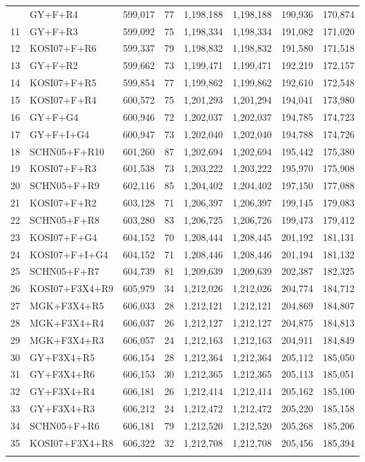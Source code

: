 \begin{longtable}{rlrrrrrr}
{10&GY+F+R4&599,017&77&1,198,188&1,198,188&190,936&170,874\\
11&GY+F+R3&599,092&75&1,198,334&1,198,334&191,082&171,020\\
12&KOSI07+F+R6&599,337&79&1,198,832&1,198,832&191,580&171,518\\
13&GY+F+R2&599,662&73&1,199,471&1,199,471&192,219&172,157\\
14&KOSI07+F+R5&599,854&77&1,199,862&1,199,862&192,610&172,548\\
15&KOSI07+F+R4&600,572&75&1,201,293&1,201,294&194,041&173,980\\
16&GY+F+G4&600,946&72&1,202,037&1,202,037&194,785&174,723\\
17&GY+F+I+G4&600,947&73&1,202,040&1,202,040&194,788&174,726\\
18&SCHN05+F+R10&601,260&87&1,202,694&1,202,694&195,442&175,380\\
19&KOSI07+F+R3&601,538&73&1,203,222&1,203,222&195,970&175,908\\
20&SCHN05+F+R9&602,116&85&1,204,402&1,204,402&197,150&177,088\\
21&KOSI07+F+R2&603,128&71&1,206,397&1,206,397&199,145&179,083\\
22&SCHN05+F+R8&603,280&83&1,206,725&1,206,726&199,473&179,412\\
23&KOSI07+F+G4&604,152&70&1,208,444&1,208,445&201,192&181,131\\
24&KOSI07+F+I+G4&604,152&71&1,208,446&1,208,446&201,194&181,132\\
25&SCHN05+F+R7&604,739&81&1,209,639&1,209,639&202,387&182,325\\
26&KOSI07+F3X4+R9&605,979&34&1,212,026&1,212,026&204,774&184,712\\
27&MGK+F3X4+R5&606,033&28&1,212,121&1,212,121&204,869&184,807\\
28&MGK+F3X4+R4&606,037&26&1,212,127&1,212,127&204,875&184,813\\
29&MGK+F3X4+R3&606,057&24&1,212,163&1,212,163&204,911&184,849\\
30&GY+F3X4+R5&606,154&28&1,212,364&1,212,364&205,112&185,050\\
31&GY+F3X4+R6&606,153&30&1,212,365&1,212,365&205,113&185,051\\
32&GY+F3X4+R4&606,181&26&1,212,414&1,212,414&205,162&185,100\\
33&GY+F3X4+R3&606,212&24&1,212,472&1,212,472&205,220&185,158\\
34&SCHN05+F+R6&606,181&79&1,212,520&1,212,520&205,268&185,206\\
35&KOSI07+F3X4+R8&606,322&32&1,212,708&1,212,708&205,456&185,394\\
}
\end{longtable}
